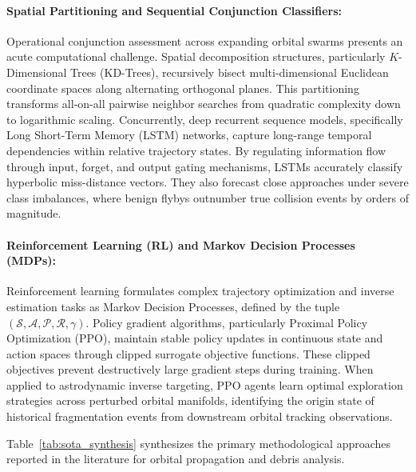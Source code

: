 \paragraph{Spatial Partitioning and Sequential Conjunction Classifiers:}
Operational conjunction assessment across expanding orbital swarms presents an acute computational challenge. Spatial decomposition structures, particularly $K$-Dimensional Trees (KD-Trees), recursively bisect multi-dimensional Euclidean coordinate spaces along alternating orthogonal planes. This partitioning transforms all-on-all pairwise neighbor searches from quadratic complexity down to logarithmic scaling. Concurrently, deep recurrent sequence models, specifically Long Short-Term Memory (LSTM) networks, capture long-range temporal dependencies within relative trajectory states. By regulating information flow through input, forget, and output gating mechanisms, LSTMs accurately classify hyperbolic miss-distance vectors. They also forecast close approaches under severe class imbalances, where benign flybys outnumber true collision events by orders of magnitude.

\paragraph{Reinforcement Learning (RL) and Markov Decision Processes (MDPs):}
Reinforcement learning formulates complex trajectory optimization and inverse estimation tasks as Markov Decision Processes, defined by the tuple $(\mathcal{S}, \mathcal{A}, \mathcal{P}, \mathcal{R}, \gamma)$. Policy gradient algorithms, particularly Proximal Policy Optimization (PPO), maintain stable policy updates in continuous state and action spaces through clipped surrogate objective functions. These clipped objectives prevent destructively large gradient steps during training. When applied to astrodynamic inverse targeting, PPO agents learn optimal exploration strategies across perturbed orbital manifolds, identifying the origin state of historical fragmentation events from downstream orbital tracking observations.

Table~\ref{tab:sota_synthesis} synthesizes the primary methodological approaches reported in the literature for orbital propagation and debris analysis.

